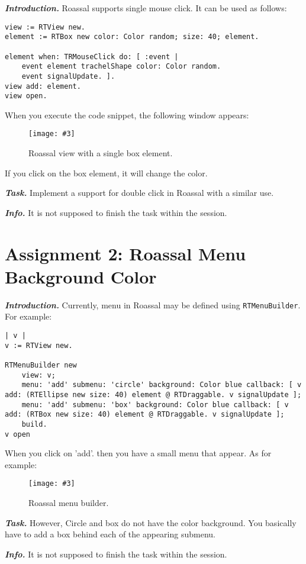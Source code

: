 \documentclass[table,a4paper]{article}
\newcommand{\myparagraph}[1]{\vspace{0.3em}\noindent \textbf{\textit{#1.}}}
\newcommand{\ct}[1]{\texttt{#1}}
\newcommand{\fig}[4]{
	\begin{figure}[#1]
		\centering
		\texttt{[image: \#3]}
		\caption{\label{fig:#3}#4}
	\end{figure}}
\begin{document}
\myparagraph{Introduction} Roassal supports single mouse click. It can be used as follows:

\begin{lstlisting}
view := RTView new.
element := RTBox new color: Color random; size: 40; element.

element when: TRMouseClick do: [ :event |
	event element trachelShape color: Color random.
	event signalUpdate. ].
view add: element.
view open.
\end{lstlisting}

When you execute the code snippet, the following window appears:

\fig{h}{0.5}{roassal-double-click}{Roassal view with a single box element.}

If you click on the box element, it will change the color.

\myparagraph{Task} Implement a support for double click in Roassal with a similar use.

\myparagraph{Info} It is not supposed to finish the task within the session.

\clearpage{}

\section{Assignment 2: Roassal Menu Background Color}
\label{sec:a2}

\myparagraph{Introduction} Currently, menu in Roassal may be defined using \ct{RTMenuBuilder}. For example:

\begin{lstlisting}
| v |
v := RTView new.

RTMenuBuilder new
	view: v;
	menu: 'add' submenu: 'circle' background: Color blue callback: [ v add: (RTEllipse new size: 40) element @ RTDraggable. v signalUpdate ];
	menu: 'add' submenu: 'box' background: Color blue callback: [ v add: (RTBox new size: 40) element @ RTDraggable. v signalUpdate ];
	build.	
v open
\end{lstlisting}

When you click on 'add'. then you have a small  menu that appear. As for example:

\fig{h}{1}{roassal-menu}{Roassal menu builder.}

\myparagraph{Task} However, Circle and box do not have the color background. You basically have to add a box behind each of the appearing submenu.

\myparagraph{Info} It is not supposed to finish the task within the session.
\end{document}
